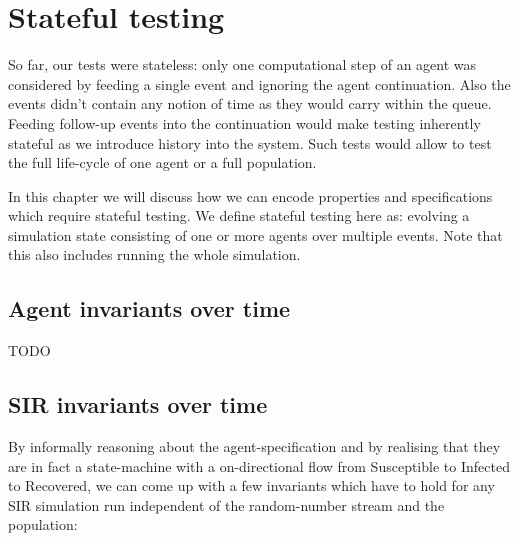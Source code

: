 \chapter{Stateful testing}
So far, our tests were stateless: only one computational step of an agent was considered by feeding a single event and ignoring the agent continuation. Also the events didn't contain any notion of time as they would carry within the queue. Feeding follow-up events into the continuation would make testing inherently stateful as we introduce history into the system. Such tests would allow to test the full life-cycle of one  agent or a full population.

In this chapter we will discuss how we can encode properties and specifications which require stateful testing. We define stateful testing here as: evolving a simulation state consisting of one or more agents over multiple events. Note that this also includes running the whole simulation.

\section{Agent invariants over time}
TODO

\section{SIR invariants over time}
By informally reasoning about the agent-specification and by realising that they are in fact a state-machine with a on-directional flow from Susceptible to Infected to Recovered, we can come up with a few invariants which have to hold for any SIR simulation run independent of the random-number stream and the population:

